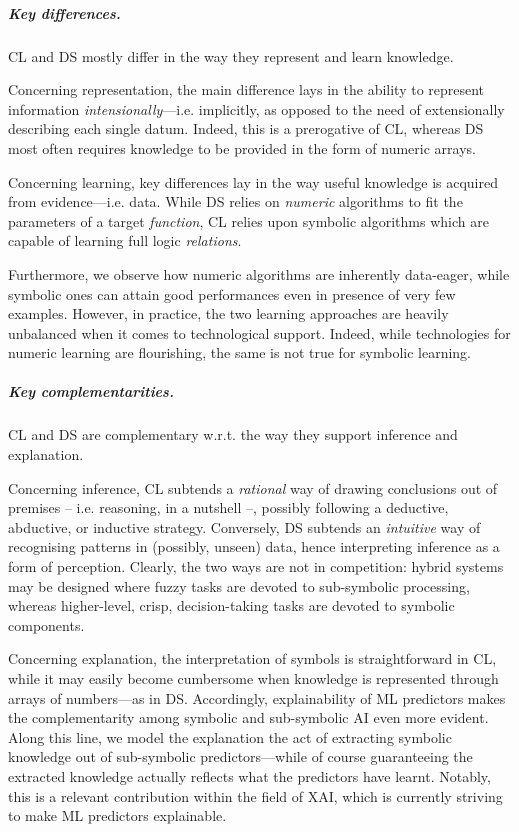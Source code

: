 \documentclass[12pt]{scrartcl}
\begin{document}
\subparagraph{Key differences.}
%
CL and DS mostly differ in the way they represent and learn knowledge.

Concerning representation, the main difference lays in the ability to represent information \emph{intensionally}---i.e. implicitly, as opposed to the need of extensionally describing each single datum.
%
Indeed, this is a prerogative of CL, whereas DS most often requires knowledge to be provided in the form of numeric arrays.

Concerning learning, key differences lay in the way useful knowledge is acquired from evidence---i.e. data.
%
While DS relies on \emph{numeric} algorithms to fit the parameters of a target \emph{function}, CL relies upon symbolic algorithms which are capable of learning full logic \emph{relations}.

Furthermore, we observe how numeric algorithms are inherently data-eager, while symbolic ones can attain good performances even in presence of very few examples.
%
However, in practice, the two learning approaches are heavily unbalanced when it comes to technological support.
%
Indeed, while technologies for numeric learning are flourishing, the same is not true for symbolic learning.

\subparagraph{Key complementarities.}
%
CL and DS are complementary w.r.t. the way they support inference and explanation.

Concerning inference, CL subtends a \emph{rational} way of drawing conclusions out of premises -- i.e. reasoning, in a nutshell --, possibly following a deductive, abductive, or inductive strategy.
%
Conversely, DS subtends an \emph{intuitive} way of recognising patterns in (possibly, unseen) data, hence interpreting inference as a form of perception.
%
Clearly, the two ways are not in competition: hybrid systems may be designed where fuzzy tasks are devoted to sub-symbolic processing, whereas higher-level, crisp, decision-taking tasks are devoted to symbolic components.

Concerning explanation, the interpretation of symbols is straightforward in CL, while it may easily become cumbersome when knowledge is represented through arrays of numbers---as in DS.
%
Accordingly, explainability of ML predictors makes the complementarity among symbolic and sub-symbolic AI even more evident.
%
Along this line, we model the explanation the act of extracting symbolic knowledge out of sub-symbolic predictors---while of course guaranteeing the extracted knowledge actually reflects what the predictors have learnt.
%
Notably, this is a relevant contribution within the field of XAI, which is currently striving to make ML predictors explainable.
\end{document}
